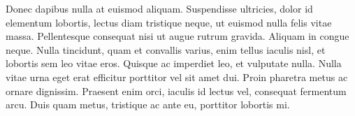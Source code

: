 Donec dapibus nulla at euismod aliquam. Suspendisse ultricies, dolor id elementum lobortis, lectus diam tristique neque, ut euismod nulla felis vitae massa. Pellentesque consequat nisi ut augue rutrum gravida. Aliquam in congue neque. Nulla tincidunt, quam et convallis varius, enim tellus iaculis nisl, et lobortis sem leo vitae eros. Quisque ac imperdiet leo, et vulputate nulla. Nulla vitae urna eget erat efficitur porttitor vel sit amet dui. Proin pharetra metus ac ornare dignissim. Praesent enim orci, iaculis id lectus vel, consequat fermentum arcu. Duis quam metus, tristique ac ante eu, porttitor lobortis mi.  
 